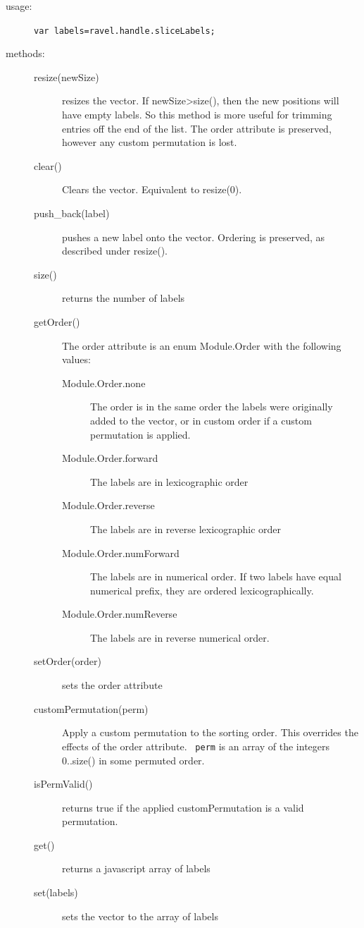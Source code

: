 \documentclass{article}
\begin{document}
\begin{description}
\item[usage:] \verb+var labels=ravel.handle.sliceLabels;+
  
\item[methods:]\mbox{}
\begin{description}
\item[resize(newSize)] resizes the vector. If newSize>size(), then the
  new positions will have empty labels. So this method is more useful
  for trimming entries off the end of the list. The order attribute is
  preserved, however any custom permutation is lost.
\item[clear()] Clears the vector. Equivalent to resize(0).
\item[push\_back(label)] pushes a new label onto the vector. Ordering
  is preserved, as described under resize().
\item[size()] returns the number of labels
  
\item[getOrder()] The order attribute is an enum Module.Order with the
  following values:
\begin{description}
\item[Module.Order.none] The order is in the same order the labels
  were originally added to the vector, or in custom order if a custom
  permutation is applied.
\item[Module.Order.forward] The labels are in lexicographic order
\item[Module.Order.reverse] The labels are in reverse lexicographic order
\item[Module.Order.numForward] The labels are in numerical order. If two labels
  have equal numerical prefix, they are ordered lexicographically.
\item[Module.Order.numReverse] The labels are in reverse numerical
order.
\end{description}
\item[setOrder(order)] sets the order attribute
  
\item[customPermutation(perm)] Apply a custom permutation to the
  sorting order. This overrides the effects of the order attribute. {\tt
    perm} is an array of the integers 0..size() in some permuted order.
\item[isPermValid()] returns true if the applied customPermutation is
  a valid permutation.
\item[get()] returns a javascript array of labels
\item[set(labels)] sets the vector to the array of labels
\end{description} 
\end{description} 
\end{document}
